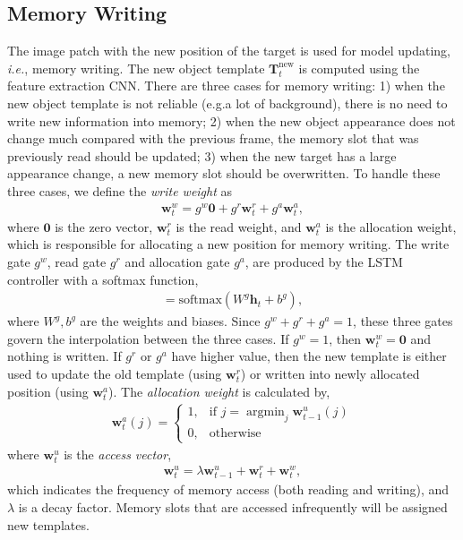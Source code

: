 \documentclass[runningheads]{llncs}
\begin{document}
\subsection{Memory Writing}

The image patch with the new position of the target is used for model updating, \emph{i.e.}, memory writing.
The new object template $\mathbf{T}^{\text{new}}_t$ is computed using the feature extraction CNN. There are three cases for memory writing: 1) when the new object template is not reliable (e.g.\contains a lot of background), there is no need to write new information into memory; 2) when the new object appearance does not change much compared with the previous frame, the memory slot that was previously read should be updated; %
3) when the new target has a large appearance change, a new memory slot should be overwritten.
To handle these three cases, we define the \textit{write weight} as
\begin{align}
\mathbf{w}^w_t =g^w\mathbf{0}+g^r\mathbf{w}^r_t + g^a\mathbf{w}^a_t, 
\end{align}
where $\mathbf{0}$ is the zero vector, $\mathbf{w}^r_t$ is the read weight, and $\mathbf{w}^a_t$  is the allocation weight, which is responsible for allocating a new position for memory writing. 
The write gate $g^w$, read gate $g^r$ and allocation gate $g^a$, are produced by the LSTM controller with a softmax function, 
\begin{align}[g^w, g^r, g^a] = \text{softmax}(W^g \mathbf{h}_{t}+b^g),
\end{align}
where $W^g, b^g$ are the weights and biases. Since $g^w+g^r+g^a=1$, these three gates govern the interpolation between the three cases.  If $g^w=1$, then $\mathbf{w}^w_t=\mathbf{0}$ and nothing is written.  If $g^r$ or $g^a$ have higher value, then the new template is either used to update the old template (using $\mathbf{w}^r_t$) or written into newly allocated position (using $\mathbf{w}^a_t$). The \textit{allocation weight} is calculated by,
\begin{align}
\mathbf{w}^a_t(j)=
\begin{cases}
1, &\text{if } j=\displaystyle \mathop{\mathrm{argmin}}_{j} \mathbf{w}^u_{t-1}(j)\\
0, &\text{otherwise}
\end{cases}
\end{align}
where $\mathbf{w}^u_t$ is the \textit{access vector},
\begin{align}
\mathbf{w}^u_t = \lambda \mathbf{w}^u_{t-1} + \mathbf{w}^r_t + \mathbf{w}^w_t,
\end{align}
which indicates the frequency of memory access (both reading and writing), and $\lambda$ is a decay factor. Memory slots that are accessed infrequently will be assigned new templates.  
\end{document}
